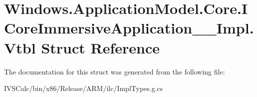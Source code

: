 \hypertarget{struct_windows_1_1_application_model_1_1_core_1_1_i_core_immersive_application_____impl_1_1_vtbl}{}\section{Windows.\+Application\+Model.\+Core.\+I\+Core\+Immersive\+Application\+\_\+\+\_\+\+Impl.\+Vtbl Struct Reference}
\label{struct_windows_1_1_application_model_1_1_core_1_1_i_core_immersive_application_____impl_1_1_vtbl}


The documentation for this struct was generated from the following file\+:\begin{DoxyCompactItemize}
\item 
I\+V\+S\+Calc/bin/x86/\+Release/\+A\+R\+M/ilc/Impl\+Types.\+g.\+cs\end{DoxyCompactItemize}
